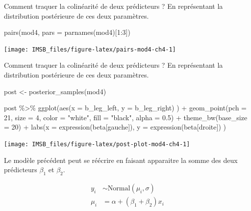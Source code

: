 \documentclass[
  a4paper,11pt,twoside,onecolumn,openright,final,oldfontcommands]{memoir}
\newenvironment{Shaded}{\begin{snugshade}}{\end{snugshade}}
\newcommand{\AttributeTok}[1]{\textcolor[rgb]{0.77,0.63,0.00}{#1}}
\newcommand{\DecValTok}[1]{\textcolor[rgb]{0.00,0.00,0.81}{#1}}
\newcommand{\FloatTok}[1]{\textcolor[rgb]{0.00,0.00,0.81}{#1}}
\newcommand{\FunctionTok}[1]{\textcolor[rgb]{0.00,0.00,0.00}{#1}}
\newcommand{\NormalTok}[1]{#1}
\newcommand{\OtherTok}[1]{\textcolor[rgb]{0.56,0.35,0.01}{#1}}
\newcommand{\SpecialCharTok}[1]{\textcolor[rgb]{0.00,0.00,0.00}{#1}}
\newcommand{\StringTok}[1]{\textcolor[rgb]{0.31,0.60,0.02}{#1}}
\theoremstyle{definition}
\theoremstyle{definition}
\theoremstyle{definition}
\theoremstyle{definition}
\theoremstyle{remark}
\begin{document}
Comment traquer la colinéarité de deux prédicteurs ? En représentant la distribution postérieure de ces deux paramètres.

\begin{Shaded}
\begin{Highlighting}[]
\FunctionTok{pairs}\NormalTok{(mod4, }\AttributeTok{pars =} \FunctionTok{parnames}\NormalTok{(mod4)[}\DecValTok{1}\SpecialCharTok{:}\DecValTok{3}\NormalTok{])}
\end{Highlighting}
\end{Shaded}

\begin{center}\texttt{[image: IMSB\_files/figure-latex/pairs-mod4-ch4-1]} \end{center}

Comment traquer la colinéarité de deux prédicteurs ? En représentant la distribution postérieure de ces deux paramètres.

\begin{Shaded}
\begin{Highlighting}[]
\NormalTok{post }\OtherTok{\textless{}{-}} \FunctionTok{posterior\_samples}\NormalTok{(mod4)}

\NormalTok{post }\SpecialCharTok{\%\textgreater{}\%}
  \FunctionTok{ggplot}\NormalTok{(}\FunctionTok{aes}\NormalTok{(}\AttributeTok{x =}\NormalTok{ b\_leg\_left, }\AttributeTok{y =}\NormalTok{ b\_leg\_right) ) }\SpecialCharTok{+}
  \FunctionTok{geom\_point}\NormalTok{(}\AttributeTok{pch =} \DecValTok{21}\NormalTok{, }\AttributeTok{size =} \DecValTok{4}\NormalTok{, }\AttributeTok{color =} \StringTok{"white"}\NormalTok{, }\AttributeTok{fill =} \StringTok{"black"}\NormalTok{, }\AttributeTok{alpha =} \FloatTok{0.5}\NormalTok{) }\SpecialCharTok{+}
  \FunctionTok{theme\_bw}\NormalTok{(}\AttributeTok{base\_size =} \DecValTok{20}\NormalTok{) }\SpecialCharTok{+}
  \FunctionTok{labs}\NormalTok{(}\AttributeTok{x =} \FunctionTok{expression}\NormalTok{(beta[gauche]), }\AttributeTok{y =} \FunctionTok{expression}\NormalTok{(beta[droite]) )}
\end{Highlighting}
\end{Shaded}

\begin{center}\texttt{[image: IMSB\_files/figure-latex/post-plot-mod4-ch4-1]} \end{center}

Le modèle précédent peut se réécrire en faisant apparaitre la somme des deux prédicteurs \(\beta_{1}\) et \(\beta_{2}\).

\[
\begin{aligned}
y_{i} &\sim \mathrm{Normal}(\mu_{i}, \sigma) \\
\mu_{i} &= \alpha + (\beta_{1} + \beta_{2}) x_{i}
\end{aligned}
\]
\end{document}

